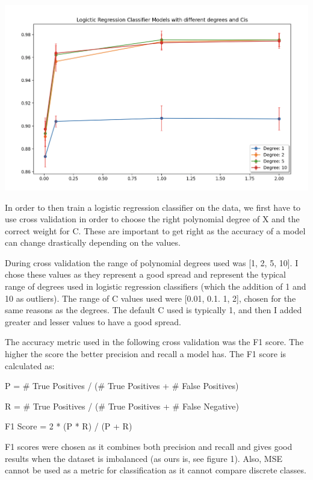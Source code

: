 \documentclass{article}
\begin{document}
\begin{center}
\includegraphics[width=\linewidth]{ia.png}
\end{center}

In order to then train a logistic regression classifier on the data, we first have to use cross validation in order to choose the right polynomial degree of X and the correct weight for C. These are important to get right as the accuracy of a model can change drastically depending on the values.

During cross validation the range of polynomial degrees used was [1, 2, 5, 10]. I chose these values as they represent a good spread and represent the typical range of degrees used in logistic regression classifiers (which the addition of 1 and 10 as outliers). The range of C values used were [0.01, 0.1. 1, 2], chosen for the same reasons as the degrees. The default C used is typically 1, and then I added greater and lesser values to have a good spread.

The accuracy metric used in the following cross validation was the F1 score. The higher the score the better precision and recall a model has. The F1 score is calculated as:
\begin{center}
P = \# True Positives / (\# True Positives + \# False Positives)

R = \# True Positives / (\# True Positives + \# False Negative)

F1 Score = 2 * (P * R) / (P + R)
\end{center}
F1 scores were chosen as it combines both precision and recall and gives good results when the dataset is imbalanced (as ours is, see figure 1). Also, MSE cannot be used as a metric for classification as it cannot compare discrete classes.
\end{document}
